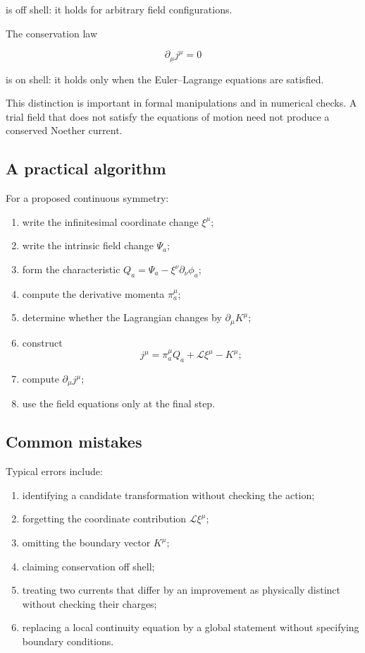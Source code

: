 is off shell: it holds for arbitrary field configurations.

The conservation law

\[
\partial_{\mu}j^{\mu}=0
\]

is on shell: it holds only when the Euler--Lagrange equations are satisfied.

This distinction is important in formal manipulations and in numerical checks. A trial field that does not satisfy the equations of motion need not produce a conserved Noether current.

\subsection{A practical algorithm}

For a proposed continuous symmetry:

\begin{enumerate}
    \item write the infinitesimal coordinate change \(\xi^{\mu}\);
    \item write the intrinsic field change \(\Psi_a\);
    \item form the characteristic \(Q_a=\Psi_a-\xi^{\nu}\partial_{\nu}\phi_a\);
    \item compute the derivative momenta \(\pi_a^{\mu}\);
    \item determine whether the Lagrangian changes by \(\partial_{\mu}K^{\mu}\);
    \item construct
    \[
    j^{\mu}
    =
    \pi_a^{\mu}Q_a
    +
    \mathcal{L}\xi^{\mu}
    -
    K^{\mu};
    \]
    \item compute \(\partial_{\mu}j^{\mu}\);
    \item use the field equations only at the final step.
\end{enumerate}

\subsection{Common mistakes}

Typical errors include:

\begin{enumerate}
    \item identifying a candidate transformation without checking the action;
    \item forgetting the coordinate contribution \(\mathcal{L}\xi^{\mu}\);
    \item omitting the boundary vector \(K^{\mu}\);
    \item claiming conservation off shell;
    \item treating two currents that differ by an improvement as physically distinct without checking their charges;
    \item replacing a local continuity equation by a global statement without specifying boundary conditions.
\end{enumerate}

